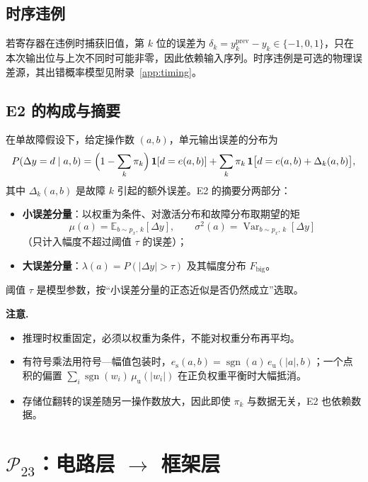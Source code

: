 \documentclass[11pt,a4paper]{ctexart}
\newcommand{\E}{\mathbb{E}}
\DeclareMathOperator{\Var}{Var}
\DeclareMathOperator{\sgn}{sgn}
\newenvironment{caution}{\par\medskip\noindent\textbf{注意.}\ }{\par\medskip}
\begin{document}
\subsection{时序违例}
若寄存器在违例时捕获旧值，第 $k$ 位的误差为 $\delta_k = y_k^{\text{prev}} - y_k \in \{-1,0,1\}$，只在本次输出位与上次不同时可能非零，因此依赖输入序列。时序违例是可选的物理误差源，其出错概率模型见附录~\ref{app:timing}。

\subsection{E2 的构成与摘要}
在单故障假设下，给定操作数 $(a,b)$，单元输出误差的分布为
\begin{equation}
P(\Delta y = d \mid a,b) = \Bigl(1 - \sum_k \pi_k\Bigr)\,\mathbf{1}[d = e(a,b)] + \sum_k \pi_k\, \mathbf{1}\bigl[d = e(a,b) + \Delta_k(a,b)\bigr],
\end{equation}
其中 $\Delta_k(a,b)$ 是故障 $k$ 引起的额外误差。E2 的摘要分两部分：
\begin{itemize}[leftmargin=*]
  \item \textbf{小误差分量}：以权重为条件、对激活分布和故障分布取期望的矩
  \begin{equation}
  \mu(a) = \E_{b \sim p_x,\,k}[\Delta y],\qquad \sigma^2(a) = \Var_{b \sim p_x,\,k}[\Delta y]
  \end{equation}
  （只计入幅度不超过阈值 $\tau$ 的误差）；
  \item \textbf{大误差分量}：$\lambda(a) = P(|\Delta y| > \tau)$ 及其幅度分布 $F_{\text{big}}$。
\end{itemize}
阈值 $\tau$ 是模型参数，按“小误差分量的正态近似是否仍然成立”选取。

\begin{caution}
\begin{itemize}[leftmargin=*]
  \item 推理时权重固定，必须以权重为条件，不能对权重分布再平均。
  \item 有符号乘法用符号—幅值包装时，$e_{\text{s}}(a,b) = \sgn(a)\,e_{\text{u}}(|a|,b)$；一个点积的偏置 $\sum_i \sgn(w_i)\,\mu_{\text{u}}(|w_i|)$ 在正负权重平衡时大幅抵消。
  \item 存储位翻转的误差随另一操作数放大，因此即使 $\pi_k$ 与数据无关，E2 也依赖数据。
\end{itemize}
\end{caution}

\section{$\mathcal{P}_{23}$：电路层 $\to$ 框架层}
\end{document}
